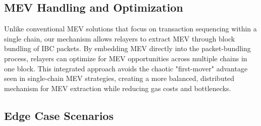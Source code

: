\documentclass{article}
\begin{document}
\subsection{MEV Handling and Optimization}

Unlike conventional MEV solutions that focus on transaction sequencing within a single chain, our mechanism allows relayers to extract MEV through block bundling of IBC packets. By embedding MEV directly into the packet-bundling process, relayers can optimize for MEV opportunities across multiple chains in one block. This integrated approach avoids the chaotic "first-mover" advantage seen in single-chain MEV strategies, creating a more balanced, distributed mechanism for MEV extraction while reducing gas costs and bottlenecks.

\subsection{Edge Case Scenarios}
\end{document}
